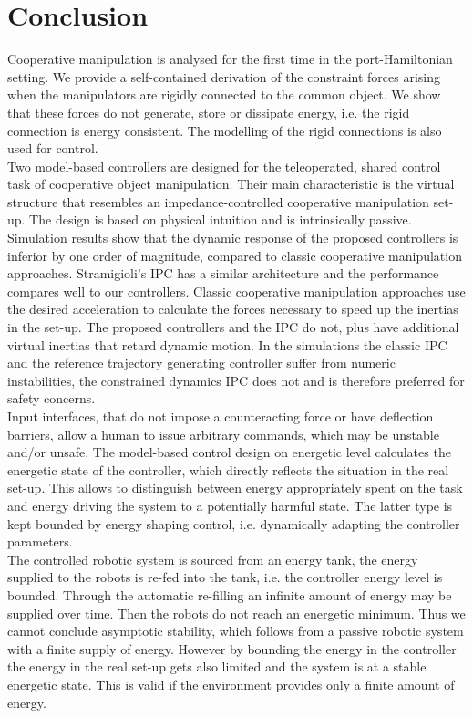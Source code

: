\documentclass[a4paper,twoside, openright,12pt]{report}
\begin{document}
\chapter{Conclusion}
Cooperative manipulation is analysed for the first time in the port-Hamiltonian setting. We provide a self-contained derivation of the constraint forces arising when the manipulators are rigidly connected to the common object. We show that these forces do not generate, store or dissipate energy, i.e. the rigid connection is energy consistent. The modelling of the rigid connections is also used for control.\\
Two model-based controllers are designed for the teleoperated, shared control task of cooperative object manipulation. Their main characteristic is the virtual structure that resembles an impedance-controlled cooperative manipulation set-up. The design is based on physical intuition and is intrinsically passive.\\ Simulation results show that the dynamic response of the proposed controllers is inferior by one order of magnitude, compared to classic cooperative manipulation approaches. Stramigioli's IPC has a similar architecture and the performance compares well to our controllers.
Classic cooperative manipulation approaches use the desired acceleration to calculate the forces necessary to speed up the inertias in the set-up. The proposed controllers and the IPC do not, plus have additional virtual inertias that retard dynamic motion.
In the simulations the classic IPC and the reference trajectory generating controller suffer from numeric instabilities, the constrained dynamics IPC does not and is therefore preferred for safety concerns.\\      
Input interfaces, that do not impose a counteracting force or have deflection barriers, allow a human to issue arbitrary commands, which may be unstable and/or unsafe. The model-based control design on energetic level calculates the energetic state of the controller, which directly reflects the situation in the real set-up. This allows to distinguish between energy appropriately spent on the task and energy driving the system to a potentially harmful state. The latter type is kept bounded by energy shaping control, i.e. dynamically adapting the controller parameters.\\
The controlled robotic system is sourced from an energy tank, the energy supplied to the robots is re-fed into the tank, i.e. the controller energy level is bounded. Through the automatic re-filling an infinite amount of energy may be supplied over time. Then the robots do not reach an energetic minimum. Thus we cannot conclude asymptotic stability, which follows from a passive robotic system with a finite supply of energy. However by bounding the energy in the controller the energy in the real set-up gets also limited and the system is at a stable energetic state. This is valid if the environment provides only a finite amount of energy.\\
\end{document}
